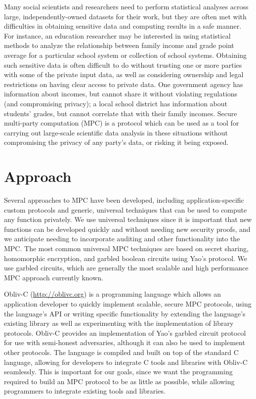 \documentclass[conference]{IEEEtran}
\begin{document}
Many social scientists and researchers need to perform statistical
analyses across large, independently-owned datasets for their work, but
they are often met with difficulties in obtaining sensitive data and
computing results in a safe manner.  For instance, an education
researcher may be interested in using statistical methods to analyze the
relationship between family income and grade point average for a
particular school system or collection of school systems.  Obtaining
such sensitive data is often difficult to do without trusting one or
more parties with some of the private input data, as well as considering
ownership and legal restrictions on having clear access to private data.
One government agency has information about incomes, but cannot share it
without violating regulations (and compromising privacy); a local school
district has information about students' grades, but cannot correlate
that with their family incomes.  Secure multi-party computation (MPC) is
a protocol which can be used as a tool for carrying out large-scale
scientific data analysis in these situations without compromising the
privacy of any party's data, or risking it being exposed.

\section{Approach}

Several approaches to MPC have been developed, including
application-specific custom protocols and generic, universal techniques
that can be used to compute any function privately.  We use universal
techniques since it is important that new functions can be developed
quickly and without needing new security proofs, and we anticipate
needing to incorporate auditing and other functionality into the MPC.
The most common universal MPC techniques are based on secret sharing,
homomorphic encryption, and garbled boolean circuits using Yao's
protocol.  We use garbled circuits, which are generally the most
scalable and high performance MPC approach currently known.

Obliv-C (\url{http://oblivc.org}) is a programming language which allows
an application developer to quickly implement scalable, secure MPC
protocols, using the language’s API or writing specific functionality by
extending the language's existing library as well as experimenting with
the implementation of library protocols\cite{cryptoeprint:2015:1153}.
Obliv-C provides an implementation of Yao's garbled circuit protocol for
use with semi-honest adversaries, although it can also be used to
implement other protocols.  The language is compiled and built on top of
the standard C language, allowing for developers to integrate C tools
and libraries with Obliv-C seamlessly.  This is important for our goals,
since we want the programming required to build an MPC protocol to be as
little as possible, while allowing programmers to integrate existing
tools and libraries.
\end{document}
